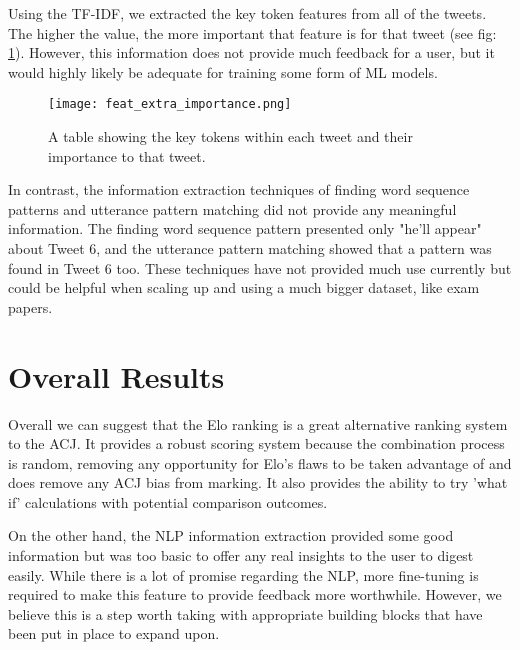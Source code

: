	Using the TF-IDF, we extracted the key token features from all of the tweets. The higher the value, the more important that feature is for that tweet (see fig: \ref{fig:feature_extract}). However, this information does not provide much feedback for a user, but it would highly likely be adequate for training some form of ML models.

	\begin{figure}[h]
		\centering
		\texttt{[image: feat\_extra\_importance.png]}
		\caption{A table showing the key tokens within each tweet and their importance to that tweet.}
		\label{fig:feature_extract}
		
	\end{figure}

	In contrast, the information extraction techniques of finding word sequence patterns and utterance pattern matching did not provide any meaningful information. The finding word sequence pattern presented only "he'll appear" about Tweet 6, and the utterance pattern matching showed that a pattern was found in Tweet 6 too. These techniques have not provided much use currently but could be helpful when scaling up and using a much bigger dataset, like exam papers.



\section{Overall Results}
\label{sec:reaults_NLP}

	Overall we can suggest that the Elo ranking is a great alternative ranking system to the ACJ. It provides a robust scoring system because the combination process is random, removing any opportunity for Elo's flaws to be taken advantage of and does remove any ACJ bias from marking. It also provides the ability to try 'what if' calculations with potential comparison outcomes.
	
	On the other hand, the NLP information extraction provided some good information but was too basic to offer any real insights to the user to digest easily. While there is a lot of promise regarding the NLP, more fine-tuning is required to make this feature to provide feedback more worthwhile. However, we believe this is a step worth taking with appropriate building blocks that have been put in place to expand upon.

